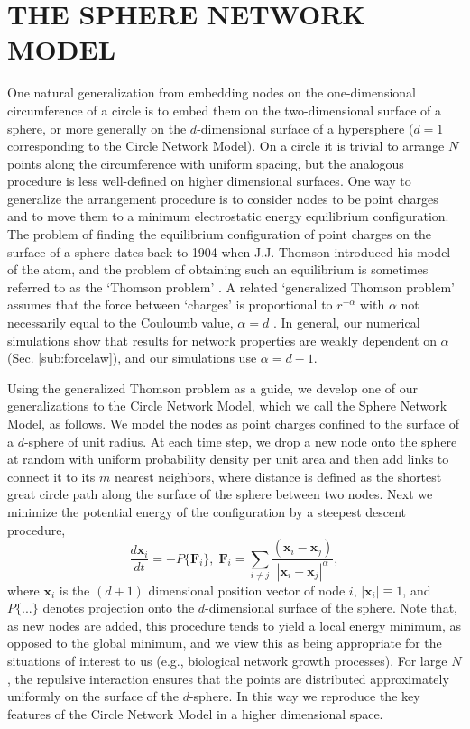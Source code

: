 \documentclass[aps,pre,manuscript,superscriptaddress,amsmath,amssymb,nofootinbib]{revtex4-1}
\begin{document}
\section{THE SPHERE NETWORK MODEL}
One natural generalization from embedding nodes on the one-dimensional circumference of a circle is to embed them on the two-dimensional surface of a sphere, or more generally on the $d$-dimensional surface of a hypersphere ($d=1$ corresponding to the Circle Network Model).
On a circle it is trivial to arrange $N$ points along the circumference with uniform spacing, but the analogous procedure is less well-defined on higher dimensional surfaces.
One way to generalize the arrangement procedure is to consider nodes to be point charges and to move them to a minimum electrostatic energy equilibrium configuration. 
The problem of finding the equilibrium configuration of point charges on the surface of a sphere dates back to 1904 when J.J. Thomson introduced his model of the atom, and the problem of obtaining such an equilibrium is sometimes referred to as the `Thomson problem' \cite{thomson1904}. 
A related `generalized Thomson problem' assumes that the force between `charges' is proportional to $r^{-\alpha}$ with $\alpha$ not necessarily equal to the Couloumb value, $\alpha = d$ \cite{nelson}.
In general, our numerical simulations show that results for network properties are weakly dependent on $\alpha$ (Sec. \ref{sub:forcelaw}), and our simulations use $\alpha = d-1$.

Using the generalized Thomson problem as a guide, we develop one of our generalizations to the Circle Network Model, which we call the Sphere Network Model, as follows.
We model the nodes as point charges confined to the surface of a $d$-sphere of unit radius.
At each time step, we drop a new node onto the sphere at random with uniform probability density per unit area and then add links to connect it to its $m$ nearest neighbors, where distance is defined as the shortest great circle path along the surface of the sphere between two nodes.
Next we minimize the potential energy of the configuration by a steepest descent procedure, 
\begin{equation}
\frac{d\textbf{x}_i}{dt} = -P\{\textbf{F}_i\},\;
\textbf{F}_i = \sum_{i \neq j} \frac{(\textbf{x}_i - \textbf{x}_j)}{|\textbf{x}_i - \textbf{x}_j|^{\alpha}},
\end{equation}
where $\textbf{x}_i$ is the $(d+1)$ dimensional position vector of node $i$, $|\textbf{x}_i| \equiv 1$, and $P\{...\}$ denotes projection onto the $d$-dimensional surface of the sphere.
Note that, as new nodes are added, this procedure tends to yield a local energy minimum, as opposed to the global minimum, and we view this as being appropriate for the situations of interest to us (e.g., biological network growth processes).
For large $N$, the repulsive interaction ensures that the points are distributed approximately uniformly on the surface of the $d$-sphere.
In this way we reproduce the key features of the Circle Network Model in a higher dimensional space.
\end{document}
